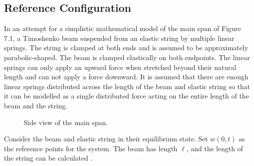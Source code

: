 \documentclass[../../main.tex]{subfiles}
\begin{document}
\subsection{Reference Configuration}
In an attempt for a simplistic mathematical model of the main span of Figure 7.1, a Timoshenko beam suspended from an elastic string by multiple linear springs. The string is clamped at both ends and is assumed to be approximately parabolic-shaped. The beam is clamped elastically on both endpoints. The linear springs can only apply an upward force when stretched beyond their natural length and can not apply a force downward. It is assumed that there are enough linear springs distributed across the length of the beam and elastic string so that it can be modelled as a single distributed force acting on the entire length of the beam and the string.
\begin{figure}[h!]
 \centering
{}
\caption{Side view of the main span.}
\end{figure} 

Consider the beam and elastic string in their equilibrium state. Set $w(0,t)$ as the reference points for the system. The beam has length $\ell$, and the length of the string can be calculated . 
\end{document}
